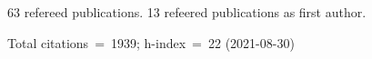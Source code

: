63 refereed publications. 13 refeered publications as first author.

Total citations~=~1939; h-index~=~22 (2021-08-30)